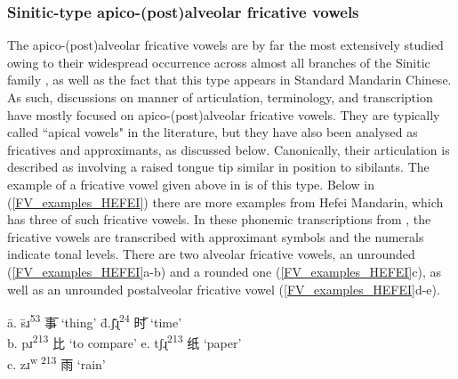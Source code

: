 \documentclass[output=paper,colorlinks,citecolor=brown,chinesefont]{langscibook}
\begin{document}
\subsubsection{Sinitic-type apico-(post)alveolar fricative vowels} \label{section:alv_postalv_FVs}
The apico-(post)alveolar fricative vowels are by far the most extensively studied owing to their widespread occurrence across almost all branches of the Sinitic family \citep{Cui_2021}, as well as the fact that this type appears in Standard Mandarin Chinese. As such, discussions on manner of articulation, terminology, and transcription have mostly focused on apico-(post)alveolar fricative vowels. They are typically called ``apical vowels" in the literature, but they have also been analysed as fricatives and approximants, as discussed below. Canonically, their articulation is described as involving a raised tongue tip similar in position to sibilants. The example of a fricative vowel given above in  is of this type. Below in (\ref{FV_examples_HEFEI}) there are more examples from Hefei Mandarin, which has three of such fricative vowels. In these phonemic transcriptions from \citet{Kong_et_al_2022}, the fricative vowels are transcribed with approximant symbols and the numerals indicate tonal levels. There are two alveolar fricative vowels, an unrounded (\ref{FV_examples_HEFEI}a-b) and a rounded one (\ref{FV_examples_HEFEI}c), as well as an unrounded postalveolar fricative vowel (\ref{FV_examples_HEFEI}d-e).

\ea \label{FV_examples_HEFEI}
    \begin{tabbing}
        \quad \=a. \quad \=sɹ\textsuperscript{53} \qquad \={\cn 事} `thing' \qquad \qquad \qquad \=d.\quad\= ʃɻ\textsuperscript{24} \quad \= {\cn 时} `time' \\
        \>b.\> pɹ\textsuperscript{213} \> {\cn 比} `to compare' \>e.\> tʃɻ\textsuperscript{213} \> {\cn 纸} `paper'\\
        \>c. \>zɹ\textsuperscript{w 213} \> {\cn 雨} `rain'
    \end{tabbing}
\z
\end{document}
